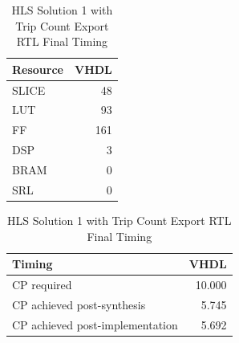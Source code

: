 \begin{table}[H]
	\centering
	\begin{minipage}[t]{0.45\linewidth}
		\centering
		\begin{tabular}{|l|r|}
			\hline
			\textbf{Resource} & \textbf{VHDL} \\
			\hline
			SLICE & 48 \\
			\hline
			LUT & 93 \\
			\hline
			FF & 161 \\
			\hline
			DSP & 3 \\
			\hline
			BRAM & 0 \\
			\hline
			SRL & 0 \\
			\hline
		\end{tabular}
		\caption{HLS Solution 1 with Trip Count Export RTL Resource Usage}
		\label{tab:hls-solution-1-export-rtl-resoruce-usage}
	\end{minipage}
	\hfill
	\begin{minipage}[t]{0.45\linewidth}
		\centering
		\begin{tabular}{|l|r|}
			\hline
			\textbf{Timing} & \textbf{VHDL} \\
			\hline
			CP required & 10.000 \\
			\hline
			CP achieved post-synthesis & 5.745 \\
			\hline
			CP achieved post-implementation & 5.692 \\
			\hline
		\end{tabular}
		\caption{HLS Solution 1 with Trip Count Export RTL Final Timing}
		\label{tab:hls-solution-1-export-rtl-final-timing}
	\end{minipage}
\end{table}